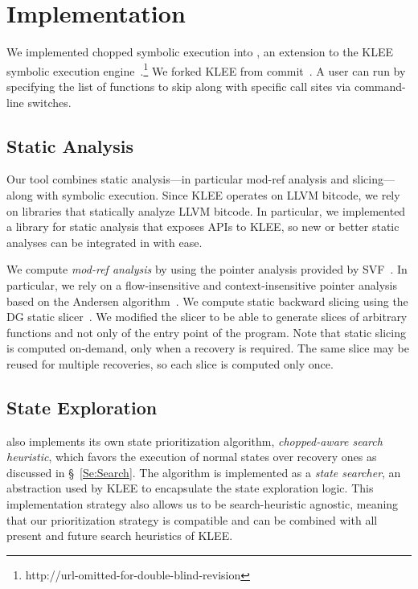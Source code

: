 
\chapter{Implementation}\label{chapter:implementation}

We implemented chopped symbolic execution into \toolname, an extension
to the KLEE symbolic execution
engine~\cite{klee}.\footnote{http://url-omitted-for-double-blind-revision}
We forked KLEE from commit~. A user can run \toolname by
specifying the list of functions to skip along with specific call
sites via command-line switches.

\section{Static Analysis}
Our tool combines static analysis---in
particular mod-ref analysis and slicing---along with symbolic
execution. Since KLEE operates on LLVM bitcode, we rely on libraries
that statically analyze LLVM bitcode. In particular, we implemented a
library for static analysis that exposes APIs to KLEE, so new or
better static analyses can be integrated in \toolname with ease.

We compute \textit{mod-ref analysis} by using the pointer analysis
provided by SVF~\cite{sui2016svf}. In particular, we rely on a
flow-insensitive and context-insensitive pointer analysis based on the
Andersen algorithm~\cite{andersen:pointeranalysis}. We compute static
backward slicing using the DG static slicer~\cite{dg}. We modified the
slicer to be able to generate slices of arbitrary functions and not
only of the entry point of the program. Note that static slicing is
computed on-demand, only when a recovery is required. The same slice
may be reused for multiple recoveries, so each slice is computed only
once.

\section{State Exploration}
\toolname also implements its own state
prioritization algorithm, \textit{chopped-aware search heuristic},
which favors the execution of normal states over recovery ones as
discussed in \S~\ref{Se:Search}. The algorithm is implemented as a
\textit{state searcher}, an abstraction used by KLEE to encapsulate
the state exploration logic. This implementation strategy also allows
us to be search-heuristic agnostic, meaning that our prioritization
strategy is compatible and can be combined with all present and future
search heuristics of KLEE.

